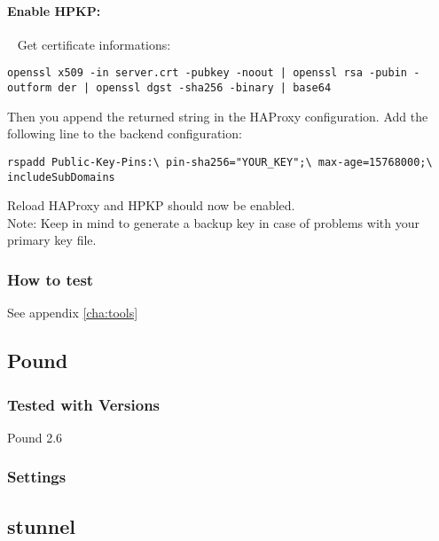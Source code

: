 \paragraph*{Enable \ac{HPKP}:}
~
Get certificate informations:
\begin{lstlisting}
openssl x509 -in server.crt -pubkey -noout | openssl rsa -pubin -outform der | openssl dgst -sha256 -binary | base64
\end{lstlisting}
Then you append the returned string in the HAProxy configuration. Add the following line to the backend configuration:
\begin{lstlisting}
rspadd Public-Key-Pins:\ pin-sha256="YOUR_KEY";\ max-age=15768000;\ includeSubDomains
\end{lstlisting}
Reload HAProxy and HPKP should now be enabled.\\
Note: Keep in mind to generate a backup key in case of problems with your primary key file.

\subsubsection{How to test}
See appendix \ref{cha:tools}

\subsection{Pound}

\subsubsection{Tested with Versions}
\begin{itemize*}
  \item Pound 2.6
\end{itemize*}

\subsubsection{Settings}


\subsection{stunnel}

